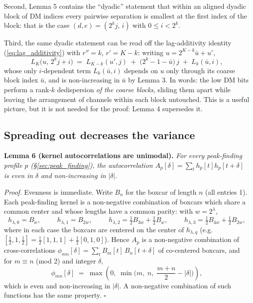 \documentclass{article}
\numberwithin{equation}{section}   %
\begin{document}
Second, Lemma 5 contains the ``dyadic'' statement that within an aligned dyadic block of DM
indices every pairwise separation is smallest at the first index of the block: that is the
case $(d,e) = (2^kj,\, i)$ with $0 \le i < 2^k$.

Third, the same dyadic statement can be read off the lag-additivity identity
(\ref{eq:lag_additivity}) with $r''=k$, $r'=K-k$: writing $u = 2^{K-k}\bar u + u'$,
\begin{equation}
L_K\big(u,\, 2^k j + i\big) \;=\; L_{K-k}(u', j) \;+\; \big(2^k - 1 - \bar u\big) \, j
   \;+\; L_k(\bar u, i),
\label{eq:dyadic_split}
\end{equation}
whose only $i$-dependent term $L_k(\bar u, i)$ depends on $u$ only through its coarse block
index $\bar u$, and is non-increasing in $\bar u$ by Lemma 3. In words: the low DM bits
perform a rank-$k$ dedispersion {\em of the coarse blocks}, sliding them apart while leaving
the arrangement of channels within each block untouched. This is a useful picture, but it is
not needed for the proof: Lemma 4 supersedes it.

\subsection{Spreading out decreases the variance}
\label{ssec:dyadic_kernel}

\par\noindent
{\bf Lemma 6 (kernel autocorrelations are unimodal).}
{\em For every peak-finding profile $p$ (\S\ref{sec:peak_finding}), the autocorrelation
$A_p[\delta] = \sum_t h_p[t] h_p[t+\delta]$ is even in $\delta$ and non-increasing in
$|\delta|$.}

\medskip
\par\noindent
{\em Proof.} Evenness is immediate. Write $B_n$ for the boxcar of length $n$ (all entries
1). Each peak-finding kernel is a non-negative combination of boxcars which share a common
center and whose lengths have a common parity: with $w = 2^\lambda$,
\begin{equation}
h_{\lambda,0} = B_w, \hspace{1cm}
h_{\lambda,1} = B_{2w}, \hspace{1cm}
h_{\lambda,2} = \tfrac12 B_{3w} + \tfrac12 B_w, \hspace{1cm}
h_{\lambda,3} = \tfrac12 B_{4w} + \tfrac12 B_{2w},
\end{equation}
where in each case the boxcars are centered on the center of $h_{\lambda,q}$
(e.g.\ $[\tfrac12, 1, \tfrac12] = \tfrac12 [1,1,1] + \tfrac12 [0,1,0]$). Hence $A_p$ is a
non-negative combination of cross-correlations
$\phi_{mn}[\delta] = \sum_t B_m[t] \, B_n[t+\delta]$ of co-centered boxcars, and for
$m \equiv n$ (mod 2) and integer $\delta$,
\begin{equation}
\phi_{mn}[\delta] \;=\; \max\left( 0, \; \min\Big( m, \; n, \; \frac{m+n}{2} - |\delta| \Big) \right),
\end{equation}
which is even and non-increasing in $|\delta|$. A non-negative combination of such functions
has the same property. $\square$
\end{document}
